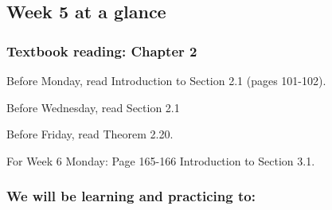 

\subsection*{Week 5 at a glance}

\subsubsection*{Textbook reading: Chapter 2}

\vspace{-20pt}

Before Monday, read Introduction to Section 2.1 (pages 101-102).

Before Wednesday, read Section 2.1

Before Friday, read Theorem 2.20.

For Week 6 Monday: Page 165-166 Introduction to Section 3.1.

\vspace{-20pt}

\subsubsection*{We will be learning and practicing to:}
\vspace{-20pt}

